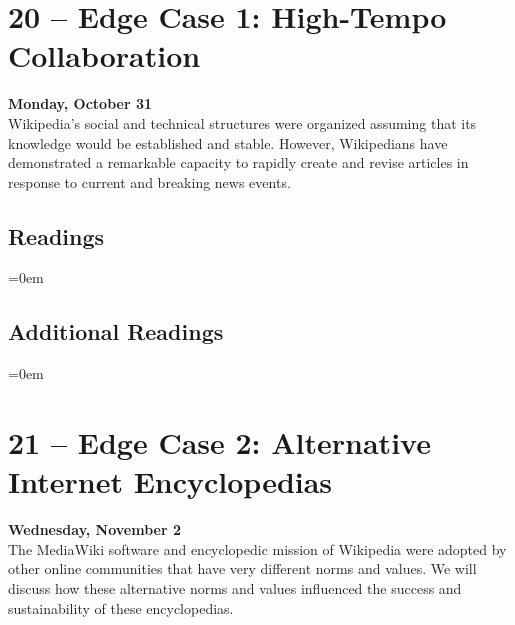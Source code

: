 \documentclass[10pt]{memoir}
\newenvironment{readinglist}{
\begin{list}{}{\leftmargin=8pt \itemindent=0em}
  \setlength{\itemsep}{8pt}
  \setlength{\parskip}{0em}
  \setlength{\parsep}{1em}
  \setlength{\parindent}{8em}}
{\end{list}}
\begin{document}
\section{20 -- Edge Case 1: High-Tempo Collaboration}
\textcolor{CUGold}{\textbf{Monday, October 31}}\\
Wikipedia's social and technical structures were organized assuming that its knowledge would be established and stable. However, Wikipedians have demonstrated a remarkable capacity to rapidly create and revise articles in response to current and breaking news events. 

    \subsection{Readings}
    \begin{readinglist}
        \item {}
        \item {}
    \end{readinglist}
    
    \subsection{Additional Readings}
    \begin{readinglist}
        \item {}
        \item {}
        \item {}
        \item {}
        \item {}
        \item {}
        \item {}
        \item {}
        \item {}
    \end{readinglist}

\section{21 -- Edge Case 2: Alternative Internet Encyclopedias}
\textcolor{CUGold}{\textbf{Wednesday, November 2}}\\
The MediaWiki software and encyclopedic mission of Wikipedia were adopted by other online communities that have very different norms and values. We will discuss how these alternative norms and values influenced the success and sustainability of these encyclopedias.
\end{document}
